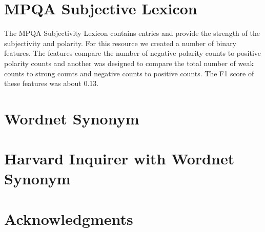 \documentclass[11pt,letterpaper]{article}
\begin{document}
\section{MPQA Subjective Lexicon}
The MPQA Subjectivity Lexicon contains entries and provide the strength of the subjectivity and polarity. For this resource we created a number of binary features. The features compare the number of negative polarity counts to positive polarity counts and another was designed to compare the total number of weak counts to strong counts and negative counts to positive counts. The F1 score of these features was about 0.13.

\section{Wordnet Synonym}


\section{Harvard Inquirer with Wordnet Synonym}

\section*{Acknowledgments}




%
%
%
%

\end{document}
